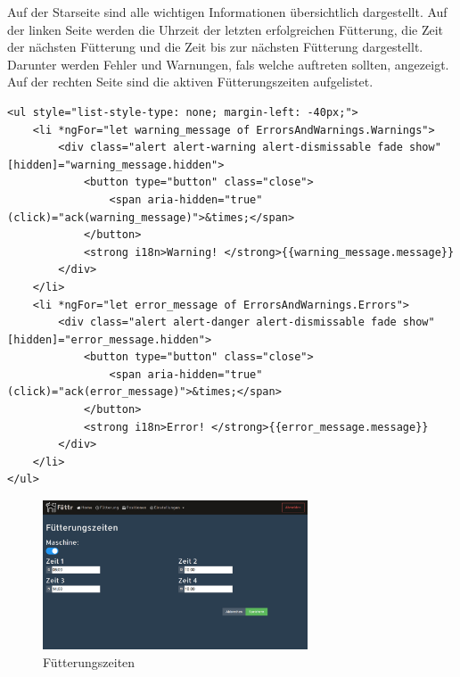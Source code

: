 Auf der Starseite sind alle wichtigen Informationen übersichtlich dargestellt. Auf der linken Seite werden die Uhrzeit der letzten erfolgreichen Fütterung, die Zeit der nächsten Fütterung und die Zeit bis zur nächsten Fütterung dargestellt. Darunter werden Fehler und Warnungen, fals welche auftreten sollten, angezeigt. Auf der rechten Seite sind die aktiven Fütterungszeiten aufgelistet.

\begin{lstlisting}[style=HtmlStyle,caption=Errors and Warnings in einem *Ngfor]
<ul style="list-style-type: none; margin-left: -40px;">
	<li *ngFor="let warning_message of ErrorsAndWarnings.Warnings">
    	<div class="alert alert-warning alert-dismissable fade show" [hidden]="warning_message.hidden">
        	<button type="button" class="close">
            	<span aria-hidden="true" (click)="ack(warning_message)">&times;</span>
            </button>
            <strong i18n>Warning! </strong>{{warning_message.message}}
        </div>
    </li>
    <li *ngFor="let error_message of ErrorsAndWarnings.Errors">
        <div class="alert alert-danger alert-dismissable fade show" [hidden]="error_message.hidden">
	        <button type="button" class="close">
	            <span aria-hidden="true" (click)="ack(error_message)">&times;</span>
            </button>
            <strong i18n>Error! </strong>{{error_message.message}}
        </div>
    </li>
</ul>
\end{lstlisting}

\begin{figure}
\vspace{-30pt}
  \begin{center}
    \includegraphics[width=0.7\textwidth]{Bilder/Greistorfer/Fuetterungszeiten.png}
  \end{center}
  \caption{Fütterungszeiten}
  \label{Fütterungszeiten}
  \vspace{-10pt}
\end{figure}

